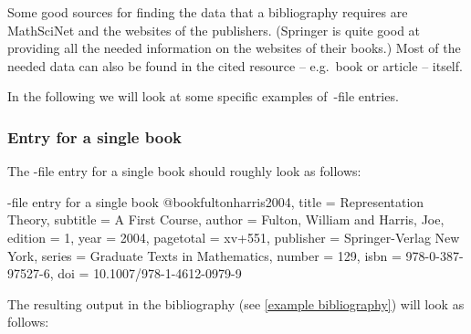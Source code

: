 Some good sources for finding the data that a bibliography requires are MathSciNet and the websites of the publishers.
(Springer is quite good at providing all the needed information on the websites of their books.)
Most of the needed data can also be found in the cited resource -- e.g.\ book or article -- itself.

In the following we will look at some specific examples of~-file entries.


\subsubsection{Entry for a single book}

The -file entry for a single book should roughly look as follows: 
\begin{showcode}[label = {bib entry single book}]{-file entry for a single book}
@book{fultonharris2004,
  title     = {Representation Theory},
  subtitle  = {A First Course},
  author    = {Fulton, William and Harris, Joe},
  edition   = {1},
  year      = {2004},
  pagetotal = {xv+551},
  publisher = {Springer-Verlag New York},
  series    = {Graduate Texts in Mathematics},
  number    = {129},
  isbn      = {978-0-387-97527-6},
  doi       = {10.1007/978-1-4612-0979-9}
}
\end{showcode}
The resulting output in the bibliography (see \cref{example bibliography}) will look as follows:

